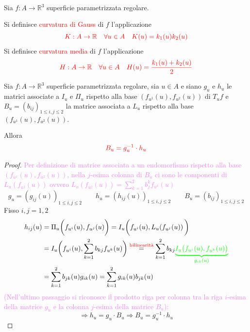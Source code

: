         \begin{definizione}
        Sia $f : A \to \mathbb{R}^3$ superficie parametrizzata regolare.

        Si definisce \textcolor{red}{curvatura di Gauss} di $f$ l'applicazione
        \[
        \textcolor{red}{K : A \to \mathbb{R} \quad \forall u \in A \quad K(u) = k_1(u)  k_2(u)}
        \]
        Si definisce \textcolor{red}{curvatura media} di $f$ l'applicazione
        \[
        \textcolor{red}{H : A \to \mathbb{R} \quad \forall u \in A \quad H(u) = \frac{k_1(u) + k_2(u)}{2}}
        \]
        \end{definizione}
        \begin{proposizione}
        \label{prop:riscrittura_matrice_associata_all_operatore_di_Weingarten}
        \mbox{}

        Sia $f : A \to \mathbb{R}^3$ superficie parametrizzata regolare, sia $u \in A$ e siano $g_u$ e $h_u$ le matrici associate
        a $I_u$ e $\Pi_u$ rispetto alla base $(f_{u^1}(u), f_{u^2}(u))$ di $T_u f$ e $B_u = (b_{ij})_{1 \le i,j \le 2}$ la matrice associata 
        a $L_u$ rispetto alla base $(f_{u^1}(u), f_{u^2}(u))$.
        
        Allora 
        \begin{equation}
        \label{eq:riscrittura_matrice_associata_all_operatore_di_Weingarten}
        \color{red} B_u = g_u^{-1} \cdot h_u
        \end{equation}
        \end{proposizione}
        \begin{proof}
        \mbox{}

        \textcolor{violet}{Per definizione di matrice associata a un endomorfismo rispetto alla base $(f_{u^1}(u), f_{u^2}(u))$, nella
        $j$-esima colonna di $B_u$ ci sono le componenti di $L_u(f_{u^j}(u))$ ovvero $\displaystyle L_u(f_{u^j}(u)) = \sum_{k=1}^2 b_j^k f_{u^k}(u)$}
        \[ g_u=(g_{ij} (u))_{1 \leq i,j \leq 2} \qquad h_u=(h_{ij}(u))_{1 \leq i,j \leq 2} \qquad B_u=(b_{ij})_{1 \leq i,j \leq 2} \]
        Fisso $i,j=1,2$
        \begin{align*}
        h_{ij}(u) &= \Pi_u \bigg( f_{u^i}(u), f_{u^j}(u) \bigg) = I_u \bigg( f_{u^i}(u), L_u(f_{u^j}(u)) \, \bigg) \\
        &= I_u \bigg( f_{u^i}(u), \sum_{k=1}^2 b_{kj} f_{u^k}(u) \bigg) \overset{\textcolor{red}{\text{bilinearità}}}{=} \sum_{k=1}^2 b_{kj} \textcolor{green}{\underbrace{I_u \big( f_{u^i}(u) , f_{u^k}(u) \big)}_{g_{ik}(u)}} \\
        &= \sum_{k=1}^2 b_{jk}(u) g_{ik}(u) = \sum_{k=1}^2 g_{ik}(u) b_{jk}(u)  
        \end{align*}
        \textcolor{violet}{(Nell'ultimo passaggio si riconosce il prodotto riga per colonna tra la riga $i$-esima della matrice $g_u$ e la colonna $j$-esima della matrice $B_u$):}
        \[
        \Rightarrow h_u = g_u \cdot B_u \Rightarrow B_u = g_u^{-1} \cdot h_u
        \]
        \end{proof}
